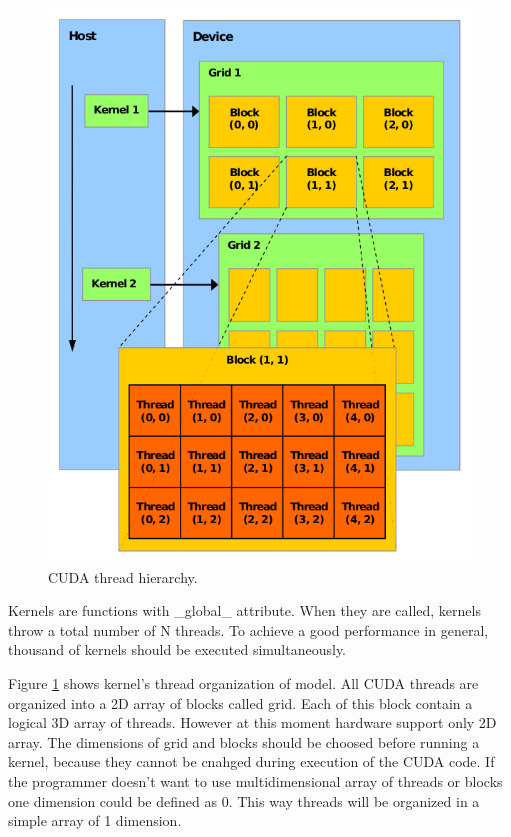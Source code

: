 \documentclass[thesis=M,english]{FITthesis}[2011/07/15]
\begin{document}
\begin{figure}[h]
\centering
\includegraphics[scale=0.4]{images/cuda_threads.png}
\caption{CUDA thread hierarchy.}
\label{fig:cuda_threads}
\end{figure}

Kernels are functions with \_global\_ attribute. When they are called, kernels throw a total number of N threads. To achieve a good performance in general, thousand of kernels should be executed simultaneously.

Figure \ref{fig:cuda_threads} shows kernel’s thread organization of model. All CUDA threads are organized into a 2D array of blocks called grid. Each of this block contain a logical 3D array of threads. However at this moment hardware support only 2D array. The dimensions of grid and blocks should be choosed before running a kernel, because they cannot be cnahged during execution of the CUDA code. If the programmer doesn't want to use multidimensional array of threads or blocks one dimension could be defined as 0. This way threads will be organized in a simple array of 1 dimension.
\end{document}
